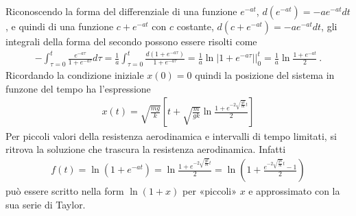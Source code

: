 \documentclass[letterpaper,10pt,italian]{jupyterBook}
\begin{document}
\sphinxAtStartPar
Riconoscendo la forma del differenziale di una funzione \(e^{-a t}\), \(d\left( e^{-a t} \right) = - a e^{-a t} dt\), e quindi di una funzione \(c + e^{-at}\) con \(c\) costante, \(d \left( c + e^{-at} \right) = - a e^{-a t} dt\), gli integrali della forma del secondo possono essere risolti come
\begin{equation*}
\begin{split}- \int_{\tau=0}^{t} \frac{e^{-a\tau}}{1+e^{-a\tau}} d\tau = \frac{1}{a} \int_{\tau=0}^{t} \frac{d \left( 1 + e^{-a \tau} \right)}{1+e^{-a \tau}} = \frac{1}{a} \left.\ln \left| 1 + e^{-a \tau} \right| \right|_{0}^{t} = \frac{1}{a} \ln \frac{1 + e^{-a t}}{2} \ .\end{split}
\end{equation*}
\sphinxAtStartPar
Ricordando la condizione iniziale \(x(0) = 0\) quindi la posizione del sistema in funzone del tempo ha l’espressione
\begin{equation*}
\begin{split}x(t) = \sqrt{\frac{mg}{k}} \left[ t  + \sqrt{\frac{m}{gk}} \ln \frac{1 + e^{- 2 \sqrt{\frac{gk}{m}} t}}{2}  \right]\end{split}
\end{equation*}
\sphinxAtStartPar
{} Per piccoli valori della resistenza aerodinamica e intervalli di tempo limitati, si ritrova la soluzione che trascura la resistenza aerodinamica. Infatti
\begin{equation*}
\begin{split}f(t) = \ln \left( 1 + e^{-at} \right) = \ln \frac{1 + e^{-2\sqrt{\frac{gk}{m}}t}}{2} = \ln \left( 1 + \frac{e^{-2\sqrt{\frac{gk}{m}}t}-1}{2} \right)\end{split}
\end{equation*}
\sphinxAtStartPar
può essere scritto nella form \(\ln (1+x)\) per «piccoli» \(x\) e approssimato con la sua serie di Taylor.
\end{document}
